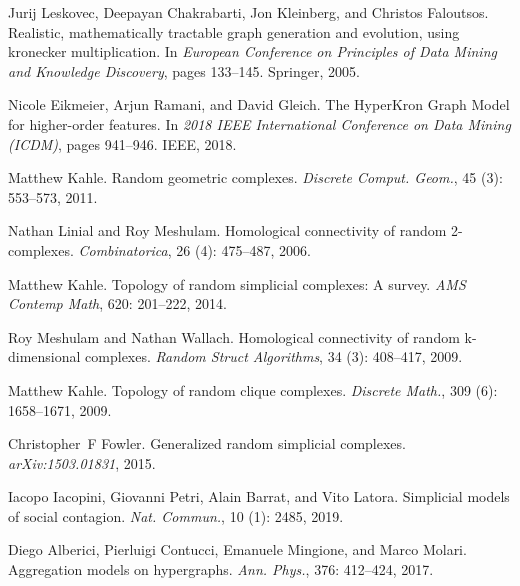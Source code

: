 Jurij Leskovec, Deepayan Chakrabarti, Jon Kleinberg, and Christos Faloutsos.
\newblock Realistic, mathematically tractable graph generation and evolution,
using kronecker multiplication.
\newblock In \emph{European Conference on Principles of Data Mining and
    Knowledge Discovery}, pages 133--145. {Springer}, 2005.

Nicole Eikmeier, Arjun Ramani, and David Gleich.
\newblock The {{HyperKron Graph Model}} for higher-order features.
\newblock In \emph{2018 {{IEEE}} International Conference on Data Mining
    ({{ICDM}})}, pages 941--946. {IEEE}, 2018.

Matthew Kahle.
\newblock Random geometric complexes.
\newblock \emph{Discrete Comput. Geom.}, 45 (3): 553--573,
2011.

Nathan Linial and Roy Meshulam.
\newblock Homological connectivity of random 2-complexes.
\newblock \emph{Combinatorica}, 26 (4): 475--487, 2006.

Matthew Kahle.
\newblock Topology of random simplicial complexes: A survey.
\newblock \emph{AMS Contemp Math}, 620: 201--222, 2014.

Roy Meshulam and Nathan Wallach.
\newblock Homological connectivity of random k-dimensional complexes.
\newblock \emph{Random Struct Algorithms}, 34 (3): 408--417,
2009.

Matthew Kahle.
\newblock Topology of random clique complexes.
\newblock \emph{Discrete Math.}, 309 (6): 1658--1671, 2009.

Christopher~F Fowler.
\newblock Generalized random simplicial complexes.
\newblock \emph{arXiv:1503.01831}, 2015.

Iacopo Iacopini, Giovanni Petri, Alain Barrat, and Vito Latora.
\newblock Simplicial models of social contagion.
\newblock \emph{Nat. Commun.}, 10 (1): 2485, 2019.

Diego Alberici, Pierluigi Contucci, Emanuele Mingione, and Marco Molari.
\newblock Aggregation models on hypergraphs.
\newblock \emph{Ann. Phys.}, 376: 412--424, 2017.


